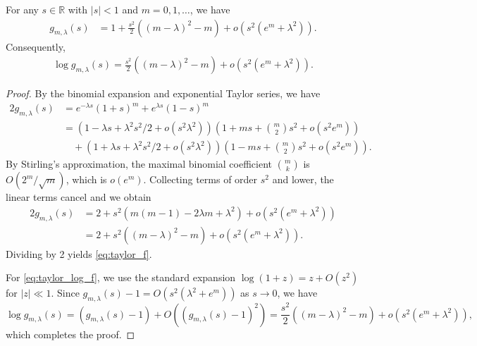 \documentclass[10pt,a4paper]{amsart}
\newcommand{\reals}{\mathbb R}
\begin{document}
\begin{lem}
\label{lem:taylor_expansion}
For any $s \in \reals$ with $|s| < 1$ and $m=0,1,\ldots$, we have
\begin{align}
\label{eq:taylor_f}
    g_{m,\lambda}(s) & = 1 + \frac{s^2}{2}\left( (m-\lambda)^2 - m \right) + o\!\left(s^2(e^m + \lambda^2)\right).
\end{align}
Consequently,
\begin{align}
\label{eq:taylor_log_f}
\log g_{m,\lambda}(s) = \frac{s^2}{2}\left( (m-\lambda)^2 - m \right)+o\!\left(s^2 (e^m + \lambda^2)\right).
\end{align}
\end{lem}

\begin{proof}
By the binomial expansion and exponential Taylor series, we have
\begin{align*}
    2 g_{m,\lambda}(s) &= e^{-\lambda s}(1+s)^m + e^{\lambda s}(1-s)^m\\
    &= \left(1 - \lambda s + \lambda^2 s^2/2 + o(s^2 \lambda^2)\right) \left(1 + m s + \binom{m}{2}s^2 + o(s^2 e^m)\right) \\
    &\quad + \left(1 + \lambda s + \lambda^2 s^2/2 + o(s^2 \lambda^2)\right) \left(1 - m s + \binom{m}{2}s^2 + o(s^2 e^m)\right).
\end{align*}
By Stirling's approximation, the maximal binomial coefficient $\binom{m}{k}$ is $O(2^m/\sqrt{m})$, which is $o(e^{m})$.
Collecting terms of order $s^2$ and lower, the linear terms cancel and we obtain
\begin{align*}
2 g_{m,\lambda}(s) &= 2 + s^2 \left(m(m-1) - 2\lambda m + \lambda^2 \right) + o(s^2(e^m + \lambda^2))\\
&= 2 + s^2 \left((m-\lambda)^2 - m \right) + o(s^2(e^m + \lambda^2)).
\end{align*}
Dividing by 2 yields \eqref{eq:taylor_f}.

For \eqref{eq:taylor_log_f}, we use the standard expansion $\log(1+z) = z + O(z^2)$ for $|z| \ll 1$. Since $g_{m,\lambda}(s) - 1 = O(s^2(\lambda^2 + e^m))$ as $s \to 0$, we have
\[
\log g_{m,\lambda}(s) = \left(g_{m,\lambda}(s) - 1\right) + O\!\left((g_{m,\lambda}(s)-1)^2\right) = \frac{s^2}{2}\left((m-\lambda)^2-m\right) + o(s^2(e^m + \lambda^2)),
\]
which completes the proof.
\end{proof}
\end{document}
